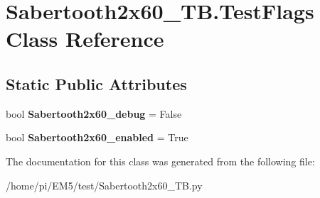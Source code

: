 \hypertarget{classSabertooth2x60__TB_1_1TestFlags}{}\section{Sabertooth2x60\+\_\+\+T\+B.\+Test\+Flags Class Reference}
\label{classSabertooth2x60__TB_1_1TestFlags}
\subsection*{Static Public Attributes}
\begin{DoxyCompactItemize}
\item 
\mbox{\label{classSabertooth2x60__TB_1_1TestFlags_aa98f53027c0f67a14cb0ca7df257bee7}} 
bool {\bfseries Sabertooth2x60\+\_\+debug} = False
\item 
\mbox{\label{classSabertooth2x60__TB_1_1TestFlags_ab6ac98c1a0b96655c80b29aa71716230}} 
bool {\bfseries Sabertooth2x60\+\_\+enabled} = True
\end{DoxyCompactItemize}


The documentation for this class was generated from the following file\+:\begin{DoxyCompactItemize}
\item 
/home/pi/\+E\+M5/test/Sabertooth2x60\+\_\+\+T\+B.\+py\end{DoxyCompactItemize}
